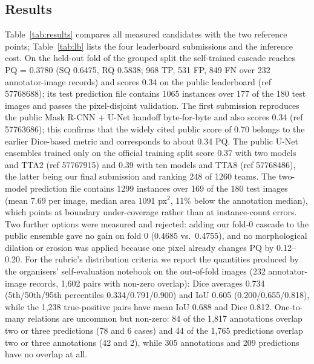 \documentclass[sigconf]{acmart}
\begin{document}
\subsection{Results}
Table~\ref{tab:results} compares all measured candidates with the two reference points; Table~\ref{tab:lb} lists the four leaderboard submissions and the inference cost.
On the held-out fold of the grouped split the self-trained cascade reaches PQ = 0.3780 (SQ 0.6475, RQ 0.5838; 968 TP, 531 FP, 849 FN over 232 annotator-image records) and scores 0.34 on the public leaderboard (ref 57768688); its test prediction file contains 1065 instances over 177 of the 180 test images and passes the pixel-disjoint validation.
The first submission reproduces the public Mask R-CNN + U-Net handoff byte-for-byte and also scores 0.34 (ref 57763686); this confirms that the widely cited public score of 0.70 belongs to the earlier Dice-based metric and corresponds to about 0.34 PQ.
The public U-Net ensembles trained only on the official training split score 0.37 with two models and TTA2 (ref 57767915) and 0.39 with ten models and TTA8 (ref 57768486), the latter being our final submission and ranking 248 of 1260 teams.
The two-model prediction file contains 1299 instances over 169 of the 180 test images (mean 7.69 per image, median area 1091 px$^2$, 11\% below the annotation median), which points at boundary under-coverage rather than at instance-count errors.
Two further options were measured and rejected: adding our fold-0 cascade to the public ensemble gave no gain on fold 0 (0.4685 vs.\ 0.4755), and no morphological dilation or erosion was applied because one pixel already changes PQ by 0.12--0.20.
For the rubric's distribution criteria we report the quantities produced by the organisers' self-evaluation notebook on the out-of-fold images (232 annotator-image records, 1{,}602 pairs with non-zero overlap): Dice averages 0.734 (5th/50th/95th percentiles 0.334/0.791/0.900) and IoU 0.605 (0.200/0.655/0.818), while the 1{,}238 true-positive pairs have mean IoU 0.688 and Dice 0.812.
One-to-many relations are uncommon but non-zero: 84 of the 1{,}817 annotations overlap two or three predictions (78 and 6 cases) and 44 of the 1{,}765 predictions overlap two or three annotations (42 and 2), while 305 annotations and 209 predictions have no overlap at all.
\end{document}
